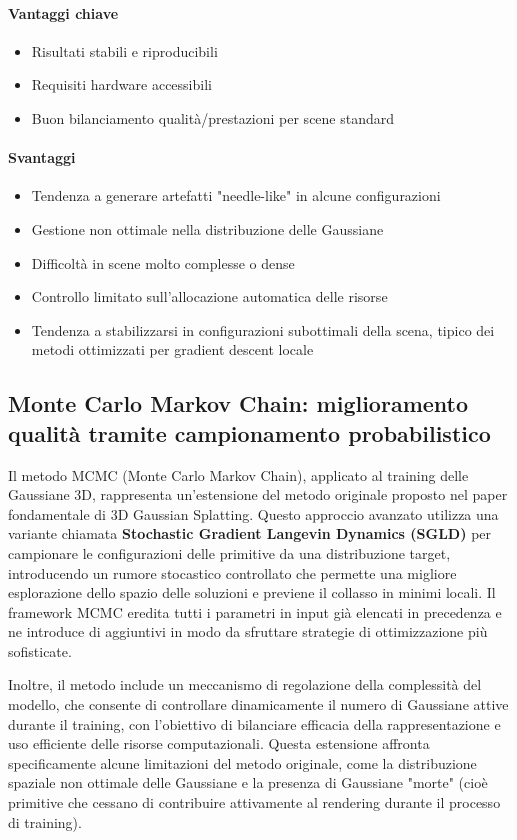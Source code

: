 \paragraph{Vantaggi chiave}
\begin{itemize}
	\item Risultati stabili e riproducibili
	\item Requisiti hardware accessibili
	\item Buon bilanciamento qualità/prestazioni per scene standard
\end{itemize}

\paragraph{Svantaggi}
\begin{itemize}
	\item Tendenza a generare artefatti "needle-like" in alcune configurazioni
	\item Gestione non ottimale nella distribuzione delle Gaussiane
	\item Difficoltà in scene molto complesse o dense
	\item Controllo limitato sull'allocazione automatica delle risorse
	\item Tendenza a stabilizzarsi in configurazioni subottimali della scena, tipico dei metodi ottimizzati per gradient descent locale
\end{itemize}

\subsection{Monte Carlo Markov Chain: miglioramento qualità tramite campionamento probabilistico}

Il metodo MCMC (Monte Carlo Markov Chain), applicato al training delle Gaussiane 3D, rappresenta un'estensione del metodo originale proposto nel paper fondamentale di 3D Gaussian Splatting. Questo approccio avanzato utilizza una variante chiamata \textbf{Stochastic Gradient Langevin Dynamics (SGLD)} per campionare le configurazioni delle primitive da una distribuzione target, introducendo un rumore stocastico controllato che permette una migliore esplorazione dello spazio delle soluzioni e previene il collasso in minimi locali. Il framework MCMC eredita tutti i parametri in input già elencati in precedenza e ne introduce di aggiuntivi in modo da sfruttare strategie di ottimizzazione più sofisticate.

Inoltre, il metodo include un meccanismo di regolazione della complessità del modello, che consente di controllare dinamicamente il numero di Gaussiane attive durante il training, con l'obiettivo di bilanciare efficacia della rappresentazione e uso efficiente delle risorse computazionali. Questa estensione affronta specificamente alcune limitazioni del metodo originale, come la distribuzione spaziale non ottimale delle Gaussiane e la presenza di Gaussiane "morte" (cioè primitive che cessano di contribuire attivamente al rendering durante il processo di training).

